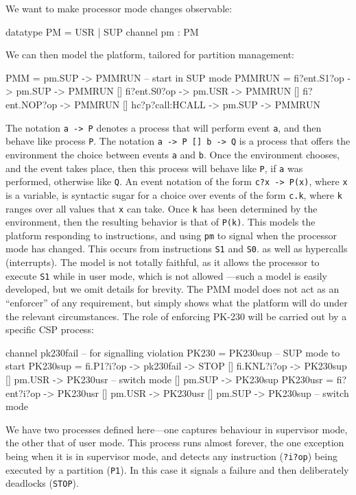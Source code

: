 We want to make processor mode changes observable:
\begin{cspm}
datatype PM = USR | SUP
channel pm : PM
\end{cspm}
We can then model the platform, tailored for partition management:
\begin{cspm}
PMM = pm.SUP -> PMMRUN -- start in SUP mode
PMMRUN =  fi?ent.S1?op    -> pm.SUP -> PMMRUN
       [] fi?ent.S0?op    -> pm.USR -> PMMRUN
       [] fi?ent.NOP?op             -> PMMRUN
       [] hc?p?call:HCALL -> pm.SUP -> PMMRUN
\end{cspm}
The notation \verb"a -> P" denotes a process that will perform event \texttt{a},
and then behave like process \texttt{P}.
The notation \verb"a -> P [] b -> Q" is a process
that offers the environment the choice between events \texttt{a} and \texttt{b}.
Once the environment chooses, and the event takes place, then this process
will behave like \texttt{P}, if \texttt{a} was performed, otherwise like \texttt{Q}.
An event notation of the form \texttt{c?x -> P(x)}, where \texttt{x} is a variable,
is syntactic sugar for
a choice over events of the form \texttt{c.k}, where \texttt{k} ranges
over all values that \texttt{x} can take. Once \texttt{k} has been determined by the environment, then the resulting behavior is that of \texttt{P(k)}.
This models the platform responding to instructions, and using \texttt{pm} to signal when the processor mode has changed.
This occurs from instructions \texttt{S1} and \texttt{S0}. as well as hypercalls (interrupts).
The model is not totally faithful, as it allows the processor to execute \texttt{S1}
while in user mode, which is not allowed
---such a model is easily developed, but we omit details for brevity.
The PMM model does not act as an ``enforcer'' of any requirement,
but simply shows what the platform will do under the relevant circumstances.
The role of enforcing PK-230 will be carried out by a specific CSP process:
\begin{cspm}
channel pk230fail -- for signalling violation
PK230 = PK230sup -- SUP mode to start
PK230sup =  fi.P1?i?op  -> pk230fail -> STOP
         [] fi.KNL?i?op -> PK230sup
         [] pm.USR      -> PK230usr -- switch mode
         [] pm.SUP      -> PK230sup
PK230usr =  fi?ent?i?op -> PK230usr
         [] pm.USR      -> PK230usr
         [] pm.SUP      -> PK230sup -- switch mode
\end{cspm}
We have two processes defined here---one captures behaviour in supervisor
mode, the other that of user mode. This process runs almost forever,
the one exception being when it is in supervisor mode, and detects
any instruction (\texttt{?i?op}) being executed by a partition (\texttt{P1}).
In this case it signals a failure and then deliberately deadlocks (\texttt{STOP}).

